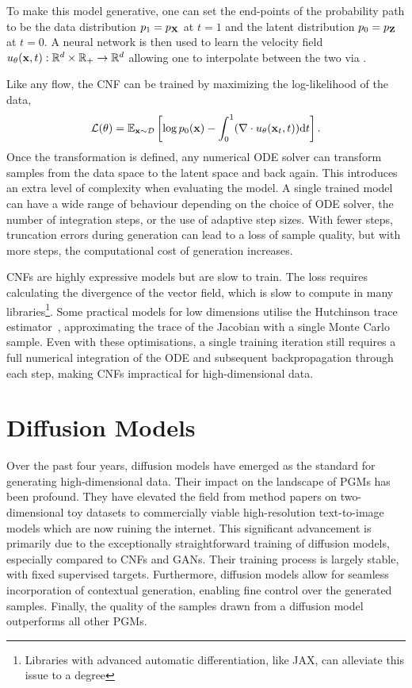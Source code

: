 To make this model generative, one can set the end-points of the probability path to be the data distribution $p_1 = p_{\mathbf{X}}$ at $t=1$ and the latent distribution $p_0 = p_{\mathbf{Z}}$ at $t=0$.
A neural network is then used to learn the velocity field $u_\theta(\mathbf{x}, t): \mathbb{R}^d \times \mathbb{R}_{+} \rightarrow \mathbb{R}^d$ allowing one to interpolate between the two via .

Like any flow, the CNF can be trained by maximizing the log-likelihood of the data,
\begin{equation}
    \label{eq:cnf_loss}
    \mathcal{L}(\theta) = \mathbb{E}_{\mathbf{x} \sim \mathcal{D}}\left[\log p_0(\mathbf{x}) - \int_0^1 (\nabla \cdot u_\theta(\mathbf{x}_t, t)) \mathrm{d} t\right].
\end{equation}
Once the transformation is defined, any numerical ODE solver can transform samples from the data space to the latent space and back again.
This introduces an extra level of complexity when evaluating the model.
A single trained model can have a wide range of behaviour depending on the choice of ODE solver, the number of integration steps, or the use of adaptive step sizes.
With fewer steps, truncation errors during generation can lead to a loss of sample quality, but with more steps, the computational cost of generation increases.

CNFs are highly expressive models but are slow to train.
The loss requires calculating the divergence of the vector field, which is slow to compute in many libraries\footnote{Libraries with advanced automatic differentiation, like JAX\cite{JAX}, can alleviate this issue to a degree}.
Some practical models for low dimensions utilise the Hutchinson trace estimator~\cite{FFJORD},  approximating the trace of the Jacobian with a single Monte Carlo sample.
Even with these optimisations, a single training iteration still requires a full numerical integration of the ODE and subsequent backpropagation through each step, making CNFs impractical for high-dimensional data.


\section{Diffusion Models}

Over the past four years, diffusion models have emerged as the standard for generating high-dimensional data.
Their impact on the landscape of PGMs has been profound.
They have elevated the field from method papers on two-dimensional toy datasets to commercially viable high-resolution text-to-image models which are now ruining the internet.
This significant advancement is primarily due to the exceptionally straightforward training of diffusion models, especially compared to CNFs and GANs.
Their training process is largely stable, with fixed supervised targets.
Furthermore, diffusion models allow for seamless incorporation of contextual generation, enabling fine control over the generated samples.
Finally, the quality of the samples drawn from a diffusion model outperforms all other PGMs.

